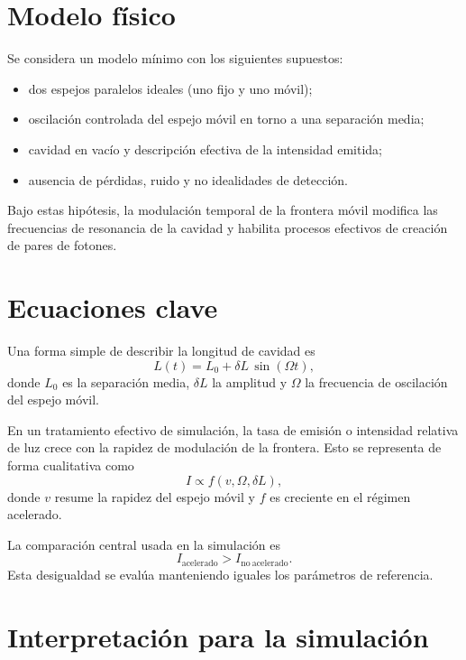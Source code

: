 \documentclass{aa}
\begin{document}
\section{Modelo físico}

Se considera un modelo mínimo con los siguientes supuestos:
\begin{itemize}
  \item dos espejos paralelos ideales (uno fijo y uno móvil);
  \item oscilación controlada del espejo móvil en torno a una separación media;
  \item cavidad en vacío y descripción efectiva de la intensidad emitida;
  \item ausencia de pérdidas, ruido y no idealidades de detección.
\end{itemize}

Bajo estas hipótesis, la modulación temporal de la frontera móvil modifica las frecuencias de resonancia de la cavidad y habilita procesos efectivos de creación de pares de fotones.

\section{Ecuaciones clave}

Una forma simple de describir la longitud de cavidad es
\begin{equation}
L(t)=L_0+\delta L\,\sin(\Omega t),
\end{equation}
donde $L_0$ es la separación media, $\delta L$ la amplitud y $\Omega$ la frecuencia de oscilación del espejo móvil.

En un tratamiento efectivo de simulación, la tasa de emisión o intensidad relativa de luz crece con la rapidez de modulación de la frontera. Esto se representa de forma cualitativa como
\begin{equation}
I \propto f(v,\Omega,\delta L),
\end{equation}
donde $v$ resume la rapidez del espejo móvil y $f$ es creciente en el régimen acelerado.

La comparación central usada en la simulación es
\begin{equation}
I_{\mathrm{acelerado}} > I_{\mathrm{no\ acelerado}}.
\end{equation}
Esta desigualdad se evalúa manteniendo iguales los parámetros de referencia.

\section{Interpretación para la simulación}
\end{document}
